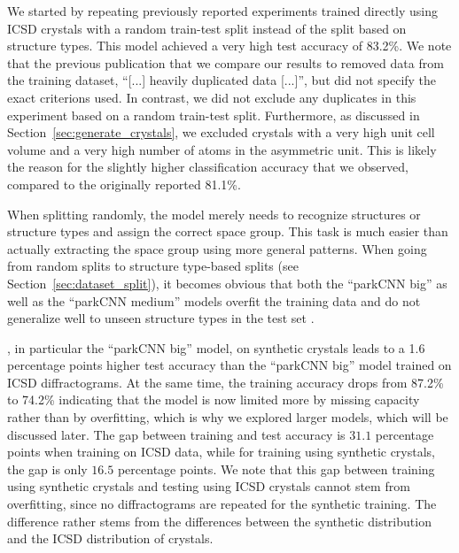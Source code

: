     We started by repeating previously reported
    experiments\supercite{parkClassificationCrystalStructure2017} trained
    directly using ICSD crystals with a random train-test split instead of the
    split based on structure types. This model achieved a very high test
    accuracy of 83.2\%. We note that the previous publication that we compare
    our results to\supercite{parkClassificationCrystalStructure2017} removed
    data from the training dataset, ``[...] heavily duplicated data
    [...]''\supercite{parkClassificationCrystalStructure2017}, but did not
    specify the exact criterions used. In contrast, we did not exclude any
    duplicates in this experiment based on a random train-test split.
    Furthermore, as discussed in Section~\ref{sec:generate_crystals}, we
    excluded crystals with a very high unit cell volume and a very high number
    of atoms in the asymmetric unit. This is likely the reason for the slightly
    higher classification accuracy that we observed, compared to the originally
    reported 81.1\%. 
    
    When splitting randomly, the model merely needs to recognize structures or
    structure types and assign the correct space group. This task is much easier
    than actually extracting the space group using more general patterns. When
    going from random splits to structure type-based splits (see
    Section~\ref{sec:dataset_split}), it becomes obvious that both the ``parkCNN
    big'' as well as the ``parkCNN medium'' models overfit the training data and
    do not generalize well to unseen structure types in the test set . 

    , in particular the ``parkCNN big'' model, on synthetic crystals leads
    to a 1.6 percentage points higher test accuracy than the ``parkCNN big''
    model trained on ICSD diffractograms. At the same time, the training
    accuracy drops from  87.2\%  to 74.2\% 
    indicating that the model is now limited more by missing capacity rather
    than by overfitting, which is why we explored larger models, which will be
    discussed later. The gap between training and test accuracy is $31.1$
    percentage points when training on ICSD data, while for training using
    synthetic crystals, the gap is only $16.5$ percentage points. We note that
    this gap between training using synthetic crystals and testing using ICSD
    crystals cannot stem from overfitting, since no diffractograms are repeated
    for the synthetic training. The difference rather stems from the differences
    between the synthetic distribution and the ICSD distribution of crystals.

